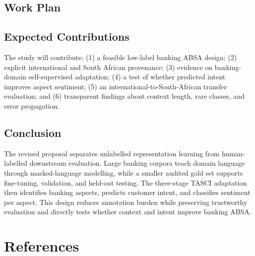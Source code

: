 \documentclass[11pt,a4paper]{article}
\begin{document}
\subsection{Work Plan}
\begin{table}[H]
\centering
\caption{Twelve-week work plan}
\scriptsize
{}
\end{table}

\subsection{Expected Contributions}
The study will contribute: (1) a feasible low-label banking ABSA design; (2) explicit international and South African provenance; (3) evidence on banking-domain self-supervised adaptation; (4) a test of whether predicted intent improves aspect sentiment; (5) an international-to-South-African transfer evaluation; and (6) transparent findings about context length, rare classes, and error propagation.

\subsection{Conclusion}
The revised proposal separates unlabelled representation learning from human-labelled downstream evaluation. Large banking corpora teach domain language through masked-language modelling, while a smaller audited gold set supports fine-tuning, validation, and held-out testing. The three-stage TASCI adaptation then identifies banking aspects, predicts customer intent, and classifies sentiment per aspect. This design reduces annotation burden while preserving trustworthy evaluation and directly tests whether context and intent improve banking ABSA.

\clearpage
\section*{References}


\end{document}

